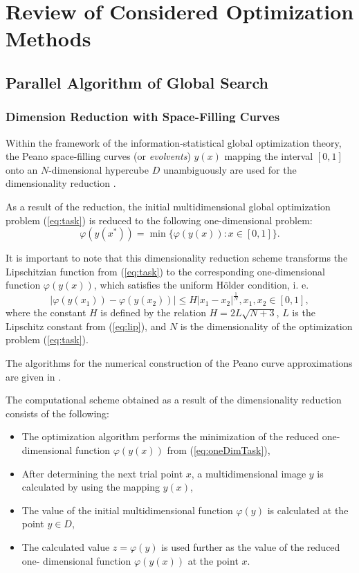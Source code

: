 \documentclass{svproc}
\begin{document}
\section{Review of Considered Optimization Methods}

\subsection{Parallel Algorithm of Global Search}
\subsubsection{Dimension Reduction with Space-Filling Curves}
Within the framework of the information-statistical global optimization theory,
the Peano space-filling curves (or \textit{evolvents}) \(y(x)\) mapping the interval \([0,1]\)
onto an \(N\)-dimensional hypercube \(D\) unambiguously are used for the dimensionality
reduction \cite{Sergeyev2013, strongin1978, Strongin2000}.
\par
As a result of the reduction, the initial multidimensional global optimization
problem (\ref{eq:task}) is reduced to the following one-dimensional problem:
\begin{equation}
\label{eq:oneDimTask}
\varphi(y(x^*))=\min\{\varphi(y(x)):x\in [0,1]\}.
\end{equation}
\par
It is important to note that this dimensionality reduction scheme transforms the %
Lipschitzian function from (\ref{eq:task}) to the corresponding one-dimensional
function \(\varphi(y(x))\), which satisfies the uniform H{\"o}lder condition, i. e.
\begin{equation}
\label{eq:holder}
|\varphi(y(x_1))-\varphi(y(x_2))|\leq H{|x_1-x_2|}^{\frac{1}{N}}, x_1,x_2\in[0,1],
\end{equation}
where the constant $H$ is defined by the relation \(H=2L\sqrt{N+3}\), \(L\) is the Lipschitz
constant from (\ref{eq:lip}), and \(N\) is the dimensionality of the optimization problem
(\ref{eq:task}).
\par
The algorithms for the numerical construction of the Peano curve approximations are
given in \cite{Strongin2000}.

\par
The computational scheme obtained as a result of the dimensionality reduction consists of the
following:
\begin{itemize}
  \item The optimization algorithm performs the minimization of the reduced one-dimensional
  function \(\varphi(y(x))\) from (\ref{eq:oneDimTask}),
  \item After determining the next trial point \(x\), a multidimensional image \(y\) is calculated by
using the mapping \(y(x)\),
  \item The value of the initial multidimensional function \(\varphi(y)\) is calculated at the point
\(y\in D\),
  \item The calculated value \(z=\varphi(y)\) is used further as the value of the reduced one-
dimensional function \(\varphi(y(x))\) at the point \(x\).
\end{itemize}
\end{document}
